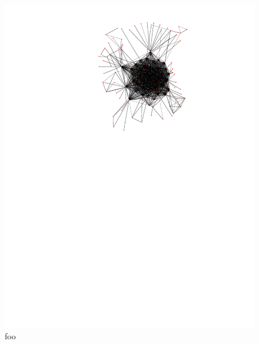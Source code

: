 \begin{figure}[h]
  \centering
  \includegraphics[scale=1.0]{images/subgraph-label-time-1077361cfa4161f22a2e4abb5ca89b8c1ad.pdf}
  \caption{foo}
  \label{fig:time-corr-com-normal}
\end{figure}

